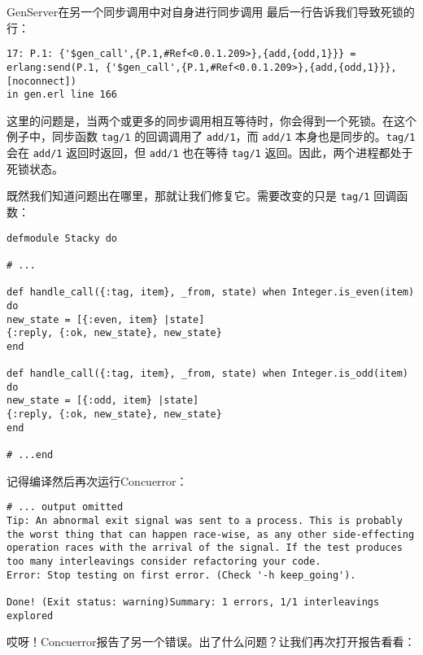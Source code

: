 \begin{example}{GenServer在另一个同步调用中对自身进行同步调用}
最后一行告诉我们导致死锁的行：

\begin{code}{}
\begin{verbatim}
17: P.1: {'$gen_call',{P.1,#Ref<0.0.1.209>},{add,{odd,1}}} = erlang:send(P.1, {'$gen_call',{P.1,#Ref<0.0.1.209>},{add,{odd,1}}}, [noconnect])
in gen.erl line 166
\end{verbatim}
\end{code}

这里的问题是，当两个或更多的同步调用相互等待时，你会得到一个死锁。在这个例子中，同步函数
\texttt{tag/1} 的回调调用了
\texttt{add/1}，而 \texttt{add/1}
本身也是同步的。\texttt{tag/1} 会在
\texttt{add/1} 返回时返回，但
\texttt{add/1} 也在等待 \texttt{tag/1}
返回。因此，两个进程都处于死锁状态。

既然我们知道问题出在哪里，那就让我们修复它。需要改变的只是
\texttt{tag/1} 回调函数：

\begin{code}{}
\begin{verbatim}
defmodule Stacky do

# ...

def handle_call({:tag, item}, _from, state) when Integer.is_even(item) do
new_state = [{:even, item} |state]
{:reply, {:ok, new_state}, new_state}
end

def handle_call({:tag, item}, _from, state) when Integer.is_odd(item) do
new_state = [{:odd, item} |state]
{:reply, {:ok, new_state}, new_state}
end

# ...end
\end{verbatim}
\end{code}

记得编译然后再次运行Concuerror：

\begin{code}{}
\begin{verbatim}
# ... output omitted
Tip: An abnormal exit signal was sent to a process. This is probably the worst thing that can happen race-wise, as any other side-effecting operation races with the arrival of the signal. If the test produces too many interleavings consider refactoring your code.
Error: Stop testing on first error. (Check '-h keep_going').

Done! (Exit status: warning)Summary: 1 errors, 1/1 interleavings explored
\end{verbatim}
\end{code}

哎呀！Concuerror报告了另一个错误。出了什么问题？让我们再次打开报告看看：


\end{example}
